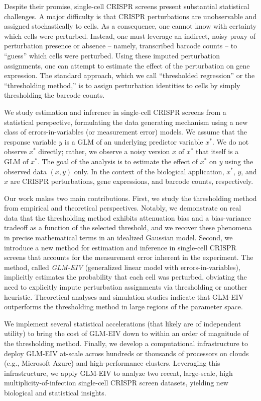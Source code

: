 \documentclass[12pt]{article}
\begin{document}
Despite their promise, single-cell CRISPR screens present substantial statistical challenges. A major difficulty is that CRISPR perturbations are unobservable and assigned stochastically to cells. As a consequence, one cannot know with certainty which cells were perturbed. Instead, one must leverage an indirect, noisy proxy of perturbation presence or absence -- namely, transcribed barcode counts -- to ``guess'' which cells were perturbed. Using these imputed perturbation assignments, one can attempt to estimate the effect of the perturbation on gene expression. The standard approach, which we call ``thresholded regression'' or the ``thresholding method,'' is to assign perturbation identities to cells by simply thresholding the barcode counts.

We study estimation and inference in single-cell CRISPR screens from a statistical perspective, formulating the data generating mechanism using a new class of errors-in-variables (or measurement error) models. We assume that the response variable $y$ is a GLM of an underlying predictor variable $x^*$. We do not observe $x^*$ directly; rather, we observe a noisy version $x$ of $x^*$ that itself is a GLM of $x^*$. The goal of the analysis is to estimate the effect of $x^*$ on $y$ using the observed data $(x , y)$ only. In the context of the biological application, $x^*$, $y$, and $x$ are CRISPR perturbations, gene expressions, and barcode counts, respectively.

Our work makes two main contributions. First, we study the thresholding method from empirical and theoretical perspectives. Notably, we demonstrate on real data that the thresholding method exhibits attenuation bias and a bias-variance tradeoff as a function of the selected threshold, and we recover these phenomena in precise mathematical terms in an idealized Gaussian model. Second, we introduce a new method for estimation and inference in single-cell CRISPR screens that accounts for the measurement error inherent in the experiment. The method, called \textit{GLM-EIV} (generalized linear model with errors-in-variables), implicitly estimates the probability that each cell was perturbed, obviating the need to explicitly impute perturbation assignments via thresholding or another heuristic. Theoretical analyses and simulation studies indicate that GLM-EIV outperforms the thresholding method in large regions of the parameter space.

We implement several statistical accelerations (that likely are of independent utility) to bring the cost of GLM-EIV down to within an order of magnitude of the thresholding method. Finally, we develop a computational infrastructure to deploy GLM-EIV at-scale across hundreds or thousands of processors on clouds (e.g., Microsoft Azure) and high-performance clusters. Leveraging this infrastructure, we apply GLM-EIV to analyze two recent, large-scale, high multiplicity-of-infection single-cell CRISPR screen datasets, yielding new biological and statistical insights. 
\end{document}
